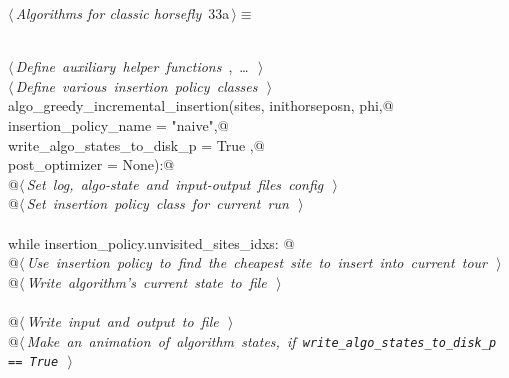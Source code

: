 \documentclass[11.5pt]{report}
\begin{document}
\begin{flushleft} \small\label{scrap25}\raggedright\small
{} $\langle\,${\itshape Algorithms for classic horsefly}\nobreak\ {\footnotesize {33a}}$\,\rangle\equiv$
\vspace{-1ex}
\begin{list}{}{} \item
\mbox{}\verb@@\\
\mbox{}\verb@@\hbox{$\langle\,${\itshape Define auxiliary helper functions}\nobreak\ {\footnotesize {}, \ldots\ }$\,\rangle$}\verb@@\\
\mbox{}\verb@@\hbox{$\langle\,${\itshape Define various insertion policy classes}\nobreak\ {\footnotesize {}}$\,\rangle$}\verb@@\\
\mbox{}\verb@def algo_greedy_incremental_insertion(sites, inithorseposn, phi,@\\
\mbox{}\verb@                                      insertion_policy_name       = "naive",@\\
\mbox{}\verb@                                      write_algo_states_to_disk_p = True   ,@\\
\mbox{}\verb@                                      post_optimizer              = None):@\\
\mbox{}\verb@      @\hbox{$\langle\,${\itshape Set log, algo-state and input-output files config}\nobreak\ {\footnotesize {}}$\,\rangle$}\verb@@\\
\mbox{}\verb@      @\hbox{$\langle\,${\itshape Set insertion policy class for current run}\nobreak\ {\footnotesize {}}$\,\rangle$}\verb@@\\
\mbox{}\verb@@\\
\mbox{}\verb@      while insertion_policy.unvisited_sites_idxs: @\\
\mbox{}\verb@         @\hbox{$\langle\,${\itshape Use insertion policy to find the cheapest site to insert into current tour}\nobreak\ {\footnotesize {}}$\,\rangle$}\verb@@\\
\mbox{}\verb@         @\hbox{$\langle\,${\itshape Write algorithm's current state to file}\nobreak\ {\footnotesize {}}$\,\rangle$}\verb@@\\
\mbox{}\verb@@\\
\mbox{}\verb@      @\hbox{$\langle\,${\itshape Write input and output to file}\nobreak\ {\footnotesize {}}$\,\rangle$}\verb@@\\
\mbox{}\verb@      @\hbox{$\langle\,${\itshape Make an animation of algorithm states, if \verb|write_algo_states_to_disk_p == True|}\nobreak\ {\footnotesize {}}$\,\rangle$}\verb@@\\

\end{list}
\end{flushleft}
\end{document}
